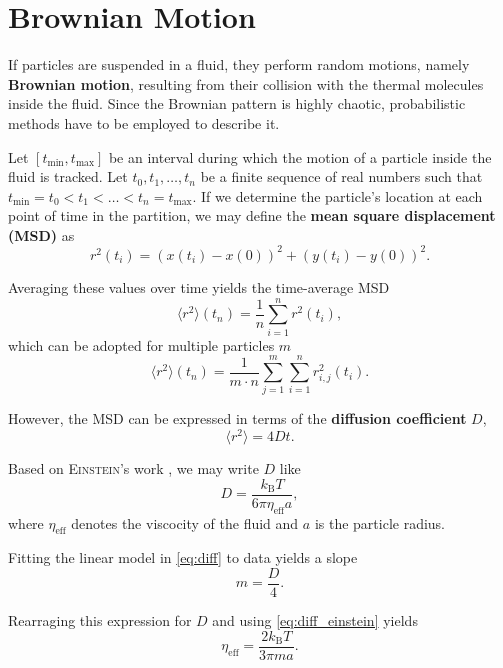 \section{Brownian Motion}
If particles are suspended in a fluid, they perform random motions, namely \textbf{Brownian motion}, resulting from their collision with the thermal molecules inside the fluid.
Since the Brownian pattern is highly chaotic, probabilistic methods have to be employed to describe it.

Let $[t_\text{min}, t_\text{max}]$ be an interval during which the motion of a particle inside the fluid is tracked.
Let $t_0, t_1,\dots,t_n$ be a finite sequence of real numbers such that $t_\text{min}=t_0<t_1<\dots<t_n=t_\text{max}$.
If we determine the particle's location at each point of time in the partition, we may define the \textbf{mean square displacement (MSD)} as
\begin{equation}\label{eq:msd}
	r^2(t_i) = (x(t_i)-x(0))^2 + (y(t_i)-y(0))^2.
\end{equation}

Averaging these values over time yields the time-average MSD
\begin{equation}\label{eq:tamsd}
	\langle r^2 \rangle(t_n) = \frac{1}{n}\sum_{i=1}^n r^2(t_i),
\end{equation}
which can be adopted for multiple particles $m$
\begin{equation}\label{eq:mptamsd}
	\langle r^2 \rangle(t_n) = \frac{1}{m\cdot n}\sum_{j=1}^m\sum_{i=1}^n r^2_{i,j}(t_i).
\end{equation}

However, the MSD can be expressed in terms of the \textbf{diffusion coefficient} $D$,
\begin{equation}\label{eq:diff}
	\langle r^2 \rangle = 4Dt.
\end{equation}

Based on \textsc{Einstein}'s work \cite{einstein}, we may write $D$ like
\begin{equation}\label{eq:diff_einstein}
	D=\frac{k_\text{B}T}{6\pi\eta_\text{eff}a},
\end{equation}
where $\eta_\text{eff}$ denotes the viscocity of the fluid and $a$ is the particle radius.

Fitting the linear model in \autoref{eq:diff} to data yields a slope
\begin{equation*}
	m = \frac{D}{4}.
\end{equation*}

Rearraging this expression for $D$ and using \autoref{eq:diff_einstein} yields
\begin{equation}\label{eq:vis}
	\eta_\text{eff} = \frac{2k_\text{B}T}{3\pi ma}.
\end{equation}

